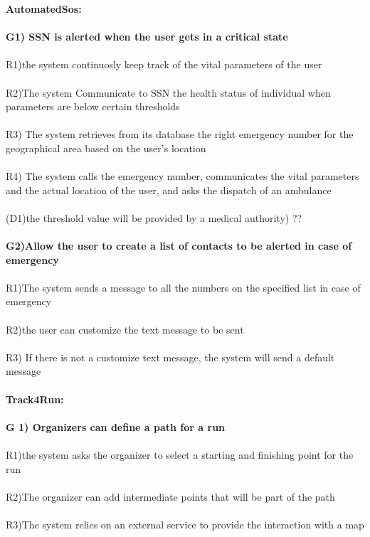 \textbf{AutomatedSos:} \\ \\ 
\textbf{G1) SSN is alerted when the user gets in a critical state} \\ \\
R1)the system continuosly keep track of the vital parameters of the user \\ \\
R2)The system Communicate to SSN the health status of individual when parameters are below certain thresholds \\ \\
R3) The system retrieves from its database the right emergency number for the geographical area based on the user’s location \\ \\

R4) The system calls the emergency number, communicates the vital parameters and the actual location of the user, and asks the dispatch of an ambulance \\ \\

(D1)the threshold value will be provided by a medical authority) ?? \\ \\
\textbf{G2)Allow the user to create a list of contacts to be alerted  in case of emergency} \\ \\

R1)The system sends a message to all the numbers on the specified list in case of emergency \\ \\
R2)the user can customize the  text message to be sent \\ \\
R3) If there is not a customize text message, the system will send a default message \\ \\

\textbf{Track4Run:}\\ \\
\textbf{G 1) Organizers can define a path for a run} \\ \\
R1)the system asks the organizer to select a starting and finishing point for the run \\ \\
R2)The organizer can add intermediate points that will be part of the path \\ \\
R3)The system relies on an external service to provide the interaction with a map \\ \\


